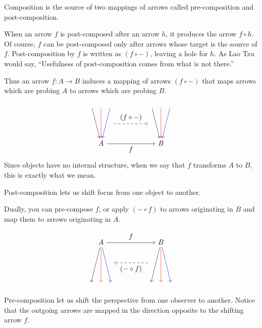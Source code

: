 \documentclass[DaoFP]{subfiles}
\begin{document}
Composition is the source of two mappings of arrows called pre-composition and post-composition. 

When an arrow $f$ is post-composed after an arrow $h$, it produces the arrow $f \circ h$. Of course, $f$ can be post-composed only after arrows whose target is the source of $f$. Post-composition by $f$ is written as $(f \circ -)$, leaving a hole for $h$. As Lao Tzu would say, ``Usefulness of post-composition comes from what is not there.''

Thus an arrow $f \colon A \to B$ induces a mapping of arrows $(f \circ -)$ that maps arrows which are probing $A$ to arrows which are probing $B$. 

\[
 \begin{tikzcd}
 \node (a1) at (0, 2) {};
 \node (a2) at (-0.5, 2) {};
 \node (a3) at (0.5, 2) {};
 \node (aa) at (0.5, 1) {};
 \node(a) at (0, 0) {A};
 \draw[->, red] (a1) -- (a);
 \draw[->] (a2) -- (a);
 \draw[->, blue] (a3) -- (a);
 \node (b1) at (3+0, 2) {};
 \node (b2) at (3-0.5, 2) {};
 \node (b3) at (3+0.5, 2) {};
 \node (bb) at (2.5, 1) {};
 \node(b) at (3, 0) {B};
 \draw[->, red] (b1) -- (b);
 \draw[->] (b2) -- (b);
 \draw[->, blue] (b3) -- (b);
 \draw[->] (a) -- node[below]{f} (b);
 \draw[->, dashed] (aa) -- node[above]{(f \circ -)} (bb);
  \end{tikzcd}
\]
Since objects have no internal structure, when we say that $f$ transforms $A$ to $B$, this is exactly what we mean. 

Post-composition lets us shift focus from one object to another.

Dually, you can pre-compose $f$, or apply $(- \circ f)$ to arrows originating in $B$ and map them to arrows originating in $A$. 

\[
 \begin{tikzcd}
 \node (a1) at (0, -2) {};
 \node (a2) at (-0.5, -2) {};
 \node (a3) at (0.5, -2) {};
 \node (aa) at (0.5, -1) {};
 \node(a) at (0, 0) {A};
 \draw[<-, red] (a1) -- (a);
 \draw[<-] (a2) -- (a);
 \draw[<-, blue] (a3) -- (a);
 \node (b1) at (3+0, -2) {};
 \node (b2) at (3-0.5, -2) {};
 \node (b3) at (3+0.5, -2) {};
 \node (bb) at (2.5, -1) {};
 \node(b) at (3, 0) {B};
 \draw[<-, red] (b1) -- (b);
 \draw[<-] (b2) -- (b);
 \draw[<-, blue] (b3) -- (b);
 \draw[->] (a) -- node[above]{f} (b);
 \draw[->, dashed] (bb) -- node[below]{(- \circ f)} (aa);
  \end{tikzcd}
\]

Pre-composition let us shift the perspective from one observer to another. Notice that the outgoing arrows are mapped in the direction opposite to the shifting arrow $f$.
\end{document}

